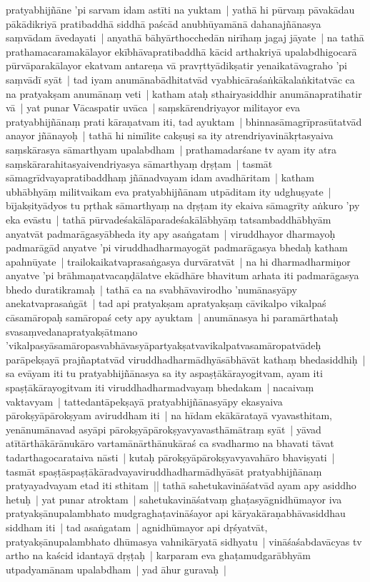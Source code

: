 \documentclass[article,12pt,a4paper]{memoir}
\begin{document}
\label{thakur75-117.21} pratyabhijñāne 'pi sarvam idam astīti na yuktam | yathā hi pūrvaṃ pāvakādau pākādikriyā pratibaddhā siddhā paścād anubhūyamānā dahanajñānasya saṃvādam āvedayati | anyathā bāhyārthocchedān nirīhaṃ jagaj jāyate | na tathā prathamacaramakālayor ekībhāvapratibaddhā kācid arthakriyā upalabdhigocarā pūrvāparakālayor ekatvam antareṇa vā pravṛttyādikṣatir yenaikatāvagraho 'pi saṃvādī syāt | \label{thakur75-117.26} tad iyam anumānabādhitatvād vyabhicāraśaṅkākalaṅkitatvāc ca na pratyakṣam anumānaṃ veti | katham ataḥ sthairyasiddhir anumānapratihatir vā | \label{thakur75-117.28} yat punar Vācaspatir uvāca | saṃskārendriyayor militayor eva pratyabhijñānaṃ prati kāraṇatvam iti, tad ayuktam | bhinnasāmagrīprasūtatvād anayor jñānayoḥ | tathā hi nimīlite cakṣuṣi sa ity atrendriyavinākṛtasyaiva saṃskārasya sāmarthyam upalabdham | prathamadarśane tv ayam ity atra saṃskārarahitasyaivendriyasya sāmarthyaṃ dṛṣṭam | tasmāt sāmagrīdvayapratibaddhaṃ jñānadvayam idam avadhāritam | katham ubhābhyāṃ militvaikam eva pratyabhijñānam utpāditam ity udghuṣyate | bījakṣityādyos tu pṛthak sāmarthyaṃ na dṛṣṭam ity ekaiva sāmagrīty aṅkuro 'py eka evāstu | \label{thakur75-118.3} tathā pūrvadeśakālāparadeśakālābhyāṃ tatsambaddhābhyām anyatvāt padmarāgasyābheda ity apy asaṅgatam | viruddhayor dharmayoḥ padmarāgād anyatve 'pi viruddhadharmayogāt padmarāgasya bhedaḥ katham apahnūyate | trailokaikatvaprasaṅgasya durvāratvāt | na hi dharmadharmiṇor anyatve 'pi brāhmaṇatvacaṇḍālatve ekādhāre bhavitum arhata iti padmarāgasya bhedo duratikramaḥ | \label{thakur75-118.7} tathā ca na svabhāvavirodho 'numānasyāpy anekatvaprasaṅgāt | tad api pratyakṣam apratyakṣaṃ cāvikalpo vikalpaś cāsamāropaḥ samāropaś cety apy ayuktam | anumānasya hi paramārthataḥ svasaṃvedanapratyakṣātmano 'vikalpasyāsamāropasvabhāvasyāpartyakṣatvavikalpatvasamāropatvādeḥ parāpekṣayā prajñaptatvād viruddhadharmādhyāsābhāvāt kathaṃ bhedasiddhiḥ | sa evāyam iti tu pratyabhijñānasya sa ity aspaṣṭākārayogitvam, ayam iti spaṣṭākārayogitvam iti viruddhadharmadvayaṃ bhedakam | \label{thakur75-118.13} nacaivaṃ vaktavyam | tattedantāpekṣayā pratyabhijñānasyāpy ekasyaiva pārokṣyāpārokṣyam aviruddham iti | na hīdam ekākāratayā vyavasthitam, yenānumānavad asyāpi pārokṣyāpārokṣyavyavasthāmātraṃ syāt | yāvad atītārthākārānukāro vartamānārthānukāraś ca svadharmo na bhavati tāvat tadarthagocarataiva nāsti | kutaḥ pārokṣyāpārokṣyavyavahāro bhaviṣyati | tasmāt spaṣṭāspaṣṭākāradvayaviruddhadharmādhyāsāt pratyabhijñānaṃ pratyayadvayam etad iti sthitam || \label{thakur75-118.19} tathā sahetukavināśatvād ayam apy asiddho hetuḥ | yat punar atroktam | sahetukavināśatvaṃ ghaṭasyāgnidhūmayor iva pratyakṣānupalambhato mudgraghaṭavināśayor api kāryakāraṇabhāvasiddhau siddham iti | tad asaṅgatam | agnidhūmayor api dṛśyatvāt, pratyakṣānupalambhato dhūmasya vahnikāryatā sidhyatu | vināśaśabdavācyas tv artho na kaścid idantayā dṛṣṭaḥ | karparam eva ghaṭamudgarābhyām utpadyamānam upalabdham | \label{thakur75-118.23} yad āhur guravaḥ |
	\pend
      
\end{document}
